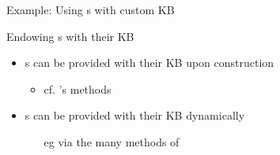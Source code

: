 \documentclass[handout]{beamer}
\begin{document}
\begin{frame}[allowframebreaks]{Example: Using s with custom KB}

    \begin{block}{Endowing s with their KB}
        \begin{itemize}
            \item {}s can be provided with their KB upon construction
            \begin{itemize}
                \item cf. 's methods
            \end{itemize}

            \item {}s can be provided with their KB dynamically
            \begin{itemize}
                \item[eg] via the many methods of 
            \end{itemize}
        \end{itemize}
    \end{block}

    \framebreak


    \framebreak

\end{frame}
\end{document}
